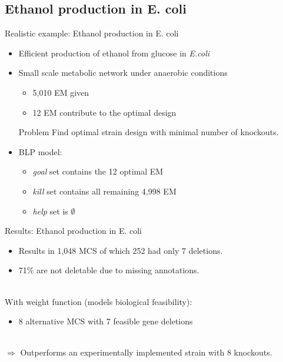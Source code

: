 \documentclass{beamer}
\begin{document}
\subsection{Ethanol production in E. coli}
\begin{frame}{Realistic example: Ethanol production in E. coli}
	\begin{itemize}
		\item Efficient production of ethanol from glucose in \emph{E.coli}
		\item Small scale metabolic network under anaerobic conditions
		\begin{itemize}
			\item 5,010 EM given
			\item 12 EM contribute to the optimal design
		\end{itemize}
\pause
	\begin{block}{Problem}
		 Find optimal strain design with minimal number of knockouts.
	\end{block}
\pause
		\item BLP model:
		\begin{itemize}
			\item \emph{goal} set contains the 12 optimal EM
			\item \emph{kill} set contains all remaining 4,998 EM
			\item \emph{help} set is $\emptyset$
		\end{itemize}
	\end{itemize}
\end{frame}

\begin{frame}{Results: Ethanol production in E. coli}
	\begin{itemize}
	\item Results in 1,048 MCS of which 252 had only 7 deletions.
	\item 71\% are not deletable due to missing annotations.
	\end{itemize}
~\\
\pause
With weight function (models biological feasibility):
	\begin{itemize}
		\item 8 alternative MCS with 7 feasible gene deletions		
	\end{itemize}
~\\
$\Rightarrow$ Outperforms an  experimentally implemented strain with 8 knockouts.
\end{frame}
\end{document}
